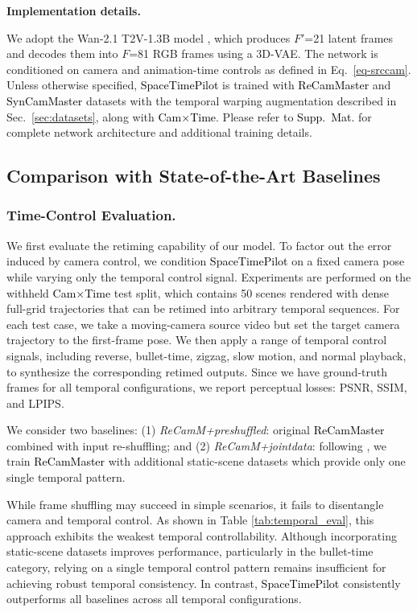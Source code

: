 \documentclass[10pt,twocolumn,letterpaper]{article}
\newcommand{\myparagraph}[1]{%
  \vspace{-0.05em}%
  \par\addvspace{0.4em}%
  \noindent\textbf{#1}\hspace{0.4em}%
}
\newcommand{\nameCOLOR}[1]{\textcolor{black}{#1}}
\newcommand{\nameMethod}{\nameCOLOR{\mbox{SpaceTimePilot}}\xspace}
\newcommand{\nameDataset}{\nameCOLOR{\mbox{Cam$\times$Time}}\xspace}
\newcommand{\recammaster}{\nameCOLOR{\mbox{ReCamMaster}}\xspace}
\newcommand{\syncammaster}{\nameCOLOR{\mbox{SynCamMaster}}\xspace}
\newcommand{\suppmat}{\nameCOLOR{\mbox{Supp.~Mat.}}\xspace}
\newcommand{\numf}{F}
\newcommand{\numflt}{F'}
\begin{document}

\myparagraph{Implementation details.}
We adopt the Wan-2.1 T2V-1.3B model \cite{wan2025}, which produces $\numflt$=21 latent frames and decodes them into $\numf$=81 RGB frames using a 3D-VAE.
The network is conditioned on camera and animation-time controls as defined in Eq.~\ref{eq-srccam}.  
Unless otherwise specified, \nameMethod is trained with \recammaster and \syncammaster datasets with the temporal warping augmentation described in Sec.~\ref{sec:datasets}, along with \nameDataset. Please refer to \suppmat for complete network architecture and additional training details.  
\subsection{Comparison with State-of-the-Art Baselines}
\subsubsection{Time-Control Evaluation.}
\label{sec:eval:time_control}
We first evaluate the retiming capability of our model. 
To factor out the error induced by camera control, we condition \nameMethod on a fixed camera pose while varying only the temporal control signal. Experiments are performed on the withheld \nameDataset test split, which contains 50 scenes rendered with dense full-grid trajectories that can be retimed into arbitrary temporal sequences.
For each test case, we take a moving-camera source video but set the target camera trajectory to the first-frame pose. 
We then apply a range of temporal control signals, including reverse, bullet-time, zigzag, slow motion, and normal playback, to synthesize the corresponding retimed outputs. 
Since we have ground-truth frames for all temporal configurations, we report perceptual losses: PSNR, SSIM, and LPIPS.

We consider two baselines:
(1) \textit{ReCamM+preshuffled}: original \recammaster combined with input re-shuffling; and
(2) \textit{ReCamM+jointdata}: following \cite{watson2025controllingspacetimediffusion,Wu2024}, we train \recammaster with additional static-scene datasets \cite{zhou2018stereo,li2019mannequin} which provide only one single temporal pattern.

While frame shuffling may succeed in simple scenarios, it fails to disentangle camera and temporal control.
As shown in Table \ref{tab:temporal_eval}, this approach exhibits the weakest temporal controllability.
Although incorporating static-scene datasets improves performance, particularly in the bullet-time category, relying on a single temporal control pattern remains insufficient for achieving robust temporal consistency.
In contrast, \nameMethod consistently outperforms all baselines across all temporal configurations.
\end{document}
